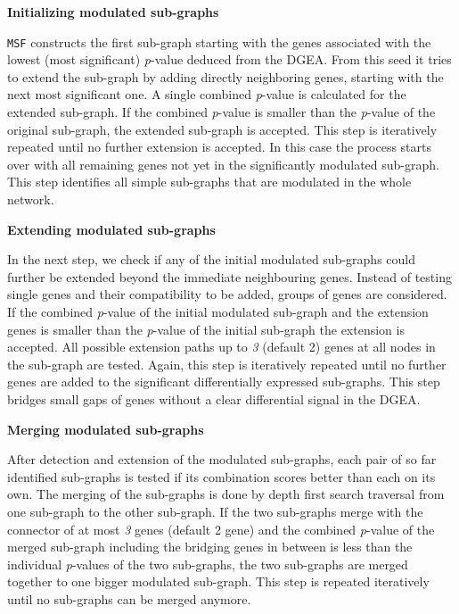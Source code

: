 \documentclass[10pt,a4paper,twocolumn]{article}
\begin{document}
	
	\textbf{Initializing modulated sub-graphs}
	
	\texttt{MSF} constructs the first sub-graph starting with the genes
	associated with the lowest (most significant) \textit{p}-value deduced from
	the DGEA. From this seed it tries to extend the sub-graph by adding directly
	neighboring genes, starting with the next most significant one. A single
	combined \textit{p}-value is calculated for the extended sub-graph.
	If the combined \textit{p}-value is smaller than the \textit{p}-value of
	the original sub-graph,
	the extended sub-graph is accepted. This step is
	iteratively repeated until no further extension is accepted. In this case
	the process starts over with all remaining genes not yet in the significantly
	modulated sub-graph. This step identifies all simple sub-graphs that
	are modulated in the whole network.\newline
	
	\textbf{Extending modulated sub-graphs}
	
	In the next step, we check if any of the initial modulated
        sub-graphs could further be extended beyond the immediate
          neighbouring genes. Instead of testing single genes and
          their compatibility to be added, groups of genes are
          considered. If the combined \textit{p}-value of the
        initial modulated sub-graph and the extension genes is smaller
        than the \textit{p}-value of the initial sub-graph the
        extension is accepted. All possible extension paths up to
        \emph{3} (default 2) genes at all nodes in the sub-graph are
        tested. Again, this step is iteratively repeated until no
        further genes are added to the significant differentially
        expressed sub-graphs. This step bridges small gaps of genes
        without a clear differential signal in the DGEA.\newline
	
	\textbf{Merging modulated sub-graphs}

        After detection and extension of the modulated sub-graphs,
          each pair of so far identified sub-graphs is tested if its
          combination scores better than each on its own. The merging of
        the sub-graphs is done by depth first search traversal from
        one sub-graph to the other sub-graph. If the two sub-graphs
        merge with the connector of at most \emph{3} genes (default 2
        gene) and the combined \textit{p}-value of the merged
        sub-graph including the bridging genes in between is less than
        the individual \textit{p}-values of the two sub-graphs, the
        two sub-graphs are merged together to one bigger
        modulated sub-graph. This step is repeated iteratively until
        no sub-graphs can be merged
          anymore.\newline
	
\end{document}
